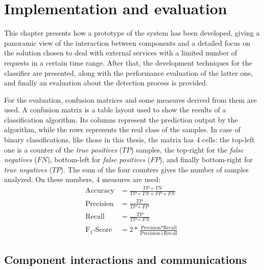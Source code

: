 \chapter{Implementation and evaluation}
\label{cha:results}
This chapter presents how a prototype of the system has been developed, giving a panoramic view of the interaction between components and a detailed focus on the solution chosen to deal with external services with a limited number of requests in a certain time range. After that, the development techniques for the classifier are presented, along with the performance evaluation of the latter one, and finally an evaluation about the detection process is provided.

For the evaluation, confusion matrices and some measures derived from them are used. A confusion matrix is a table layout used to show the results of a classification algorithm. Its columns represent the prediction output by the algorithm, while the rows represents the real class of the samples. In case of binary classifications, like those in this thesis, the matrix has 4 cells: the top-left one is a counter of the \emph{true positives} ($TP$) samples, the top-right for the \emph{false negatives} ($FN$), bottom-left for \emph{false positives} ($FP$), and finally bottom-right for \emph{true negatives} ($TP$). The sum of the four counters gives the number of samples analyzed. On these numbers, 4 measures are used:
\begin{equation*}
\begin{split}
\text{Accuracy} & = \frac{TP + TN}{TP + TN + FP + FN}\\
\text{Precision} & = \frac{TP}{TP + FP} \\ 
\text{Recall} & = \frac{TP}{TP + FN}\\
\text{F}_1\text{-Score} & = 2 * \frac{\text{Precision} * \text{Recall}}{\text{Precision} + \text{Recall}}
\end{split}
\end{equation*}

\section{Component interactions and communications}
\label{sec:view}

